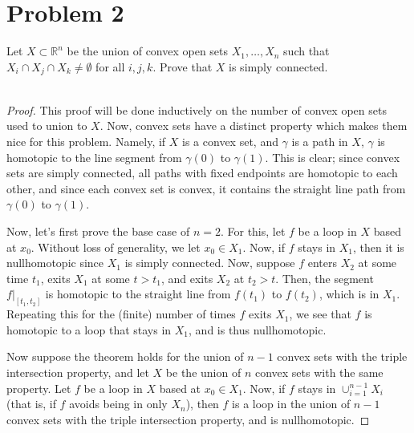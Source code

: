 \documentclass[fontsize=11pt]{scrartcl} %
\numberwithin{equation}{section} %
\numberwithin{figure}{section} %
\numberwithin{table}{section} %
\newcommand{\R}{\mathbb{R}}
\begin{document}
\newpage

\section*{Problem 2}
Let $X\subset \R^n$ be the union of convex open sets $X_1,\dots,X_n$ such that
$X_i\cap X_j\cap X_k\neq\emptyset$ for all $i,j,k$. Prove that $X$ is simply
connected.
\\
\\
\begin{proof}
    This proof will be done inductively on the number of convex open sets used
    to union to $X$. Now, convex sets have a distinct property which makes them
    nice for this problem. Namely, if $X$ is a convex set, and $\gamma$ is a
    path in $X$, $\gamma$ is homotopic to the line segment from $\gamma(0)$ to
    $\gamma(1)$. This is clear; since convex sets are simply connected, all
    paths with fixed endpoints are homotopic to each other, and since each
    convex set is convex, it contains the straight line path from $\gamma(0)$ to
    $\gamma(1)$.

    Now, let's first prove the base case of $n=2$. For this, let $f$ be a loop
    in $X$ based at $x_0$. Without loss of generality, we let $x_0\in X_1$. Now,
    if $f$ stays in $X_1$, then it is nullhomotopic since $X_1$ is simply
    connected. Now, suppose $f$ enters $X_2$ at some time $t_1$, exits $X_1$ at
    some $t>t_1$, and exits $X_2$ at $t_2>t$. Then, the segment $f|_{[t_1,t_2]}$
    is homotopic to the straight line from $f(t_1)$ to $f(t_2)$, which is in
    $X_1$. Repeating this for the (finite) number of times $f$ exits $X_1$, we
    see that $f$ is homotopic to a loop that stays in $X_1$, and is thus
    nullhomotopic.

    Now suppose the theorem holds for the union of $n-1$ convex sets with the
    triple intersection property, and let $X$ be the union of $n$ convex sets
    with the same property. Let $f$ be a loop in $X$ based at $x_0\in X_1$. Now,
    if $f$ stays in $\cup_{i=1}^{n-1}X_i$ (that is, if $f$ avoids being in only
    $X_n$), then $f$ is a loop in the union of $n-1$ convex sets with the triple
    intersection property, and is nullhomotopic. 
    

\end{proof}
\end{document}
